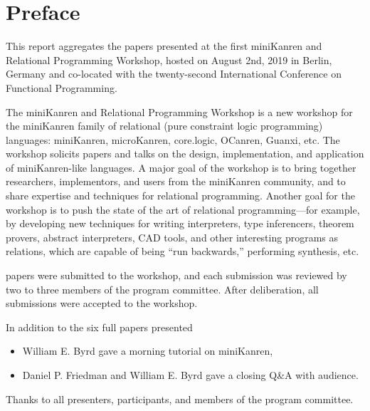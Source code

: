 \documentclass[a4paper]{book}
\date{August 22, 2019}
\author{William E. Byrd \and Nada Amin}
\begin{document}
\frontmatter
\setcounter{page}{3}  %
\chapter*{Preface}
This report aggregates the papers presented at the first miniKanren
and Relational Programming Workshop, hosted on August 2nd, 2019 in
Berlin, Germany and co-located with the twenty-second International
Conference on Functional Programming.

\vspace{5pt}
\noindent
The miniKanren and Relational Programming Workshop is a new workshop for the miniKanren family of relational (pure constraint logic programming) languages: miniKanren, microKanren, core.logic, OCanren, Guanxi, etc. The workshop solicits papers and talks on the design, implementation, and application of miniKanren-like languages. A major goal of the workshop is to bring together researchers, implementors, and users from the miniKanren community, and to share expertise and techniques for relational programming. Another goal for the workshop is to push the state of the art of relational programming—for example, by developing new techniques for writing interpreters, type inferencers, theorem provers, abstract interpreters, CAD tools, and other interesting programs as relations, which are capable of being “run backwards,” performing synthesis, etc.

\vspace{5pt}
 papers were submitted to the workshop, and each submission was reviewed by
two to three members of the program committee.  After deliberation, all submissions
were accepted to the workshop.

\vspace{5pt}
\noindent
In addition to the six full papers  presented
\begin{itemize}
\item William E. Byrd gave a morning tutorial on miniKanren,
\item Daniel P. Friedman and William E. Byrd gave a closing Q\&A with audience.
\end{itemize}

\vspace{5pt}
\noindent
Thanks to all presenters, participants, and members of the
program committee.

\ \\
\ \\
\ \\
\ \\
\end{document}
